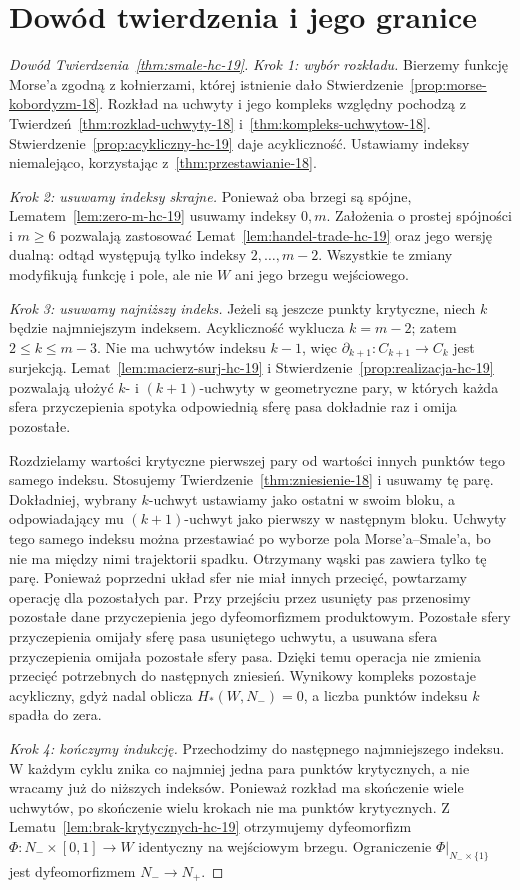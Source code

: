 \section{Dowód twierdzenia i jego granice}
\label{sec:dowod-smale-19}

\begin{proof}[Dowód Twierdzenia~\ref{thm:smale-hc-19}]
\emph{Krok 1: wybór rozkładu.}
Bierzemy funkcję Morse'a
zgodną z kołnierzami,
której istnienie dało
Stwierdzenie~\ref{prop:morse-kobordyzm-18}.
Rozkład na uchwyty
i jego kompleks względny
pochodzą z
Twierdzeń~\ref{thm:rozklad-uchwyty-18}
i~\ref{thm:kompleks-uchwytow-18}.
Stwierdzenie~\ref{prop:acykliczny-hc-19}
daje acykliczność.
Ustawiamy indeksy
niemalejąco, korzystając
z~\ref{thm:przestawianie-18}.

\emph{Krok 2: usuwamy indeksy skrajne.}
Ponieważ oba brzegi są
spójne, Lematem~\ref{lem:zero-m-hc-19}
usuwamy indeksy $0,m$.
Założenia o prostej
spójności i $m\geq6$
pozwalają zastosować
Lemat~\ref{lem:handel-trade-hc-19}
oraz jego wersję dualną:
odtąd występują tylko
indeksy $2,\ldots,m-2$.
Wszystkie te zmiany
modyfikują funkcję
i pole, ale nie $W$
ani jego brzegu wejściowego.

\emph{Krok 3: usuwamy najniższy indeks.}
Jeżeli są jeszcze punkty
krytyczne, niech $k$
będzie najmniejszym
indeksem. Acykliczność
wyklucza $k=m-2$;
zatem $2\leq k\leq m-3$.
Nie ma uchwytów indeksu
$k-1$, więc
$\partial_{k+1}:C_{k+1}\to C_k$
jest surjekcją.
Lemat~\ref{lem:macierz-surj-hc-19}
i Stwierdzenie~\ref{prop:realizacja-hc-19}
pozwalają ułożyć
$k$- i $(k+1)$-uchwyty
w geometryczne pary,
w których każda
sfera przyczepienia
spotyka odpowiednią
sferę pasa dokładnie raz
i omija pozostałe.

Rozdzielamy wartości
krytyczne pierwszej pary
od wartości innych
punktów tego samego
indeksu. Stosujemy
Twierdzenie~\ref{thm:zniesienie-18}
i usuwamy tę parę.
Dokładniej, wybrany $k$-uchwyt ustawiamy jako ostatni
w swoim bloku, a odpowiadający mu $(k+1)$-uchwyt jako pierwszy
w następnym bloku. Uchwyty tego samego indeksu można przestawiać
po wyborze pola Morse'a--Smale'a, bo nie ma między nimi
trajektorii spadku. Otrzymany wąski pas zawiera tylko tę parę.
Ponieważ poprzedni
układ sfer nie miał
innych przecięć,
powtarzamy operację
dla pozostałych par.
Przy przejściu przez usunięty pas przenosimy pozostałe dane
przyczepienia jego dyfeomorfizmem produktowym. Pozostałe sfery
przyczepienia omijały sferę pasa usuniętego uchwytu, a usuwana
sfera przyczepienia omijała pozostałe sfery pasa. Dzięki temu
operacja nie zmienia przecięć potrzebnych do następnych zniesień.
Wynikowy kompleks
pozostaje acykliczny,
gdyż nadal oblicza
$H_*(W,N_-)=0$,
a liczba punktów
indeksu $k$ spadła
do zera.

\emph{Krok 4: kończymy indukcję.}
Przechodzimy do następnego
najmniejszego indeksu.
W każdym cyklu znika
co najmniej jedna
para punktów krytycznych,
a nie wracamy już do
niższych indeksów.
Ponieważ rozkład ma
skończenie wiele uchwytów,
po skończenie wielu
krokach nie ma punktów
krytycznych. Z
Lematu~\ref{lem:brak-krytycznych-hc-19}
otrzymujemy dyfeomorfizm
$\Phi:N_-\times[0,1]\to W$
identyczny na wejściowym
brzegu. Ograniczenie
$\Phi|_{N_-\times\{1\}}$
jest dyfeomorfizmem
$N_-\to N_+$.
\end{proof}

